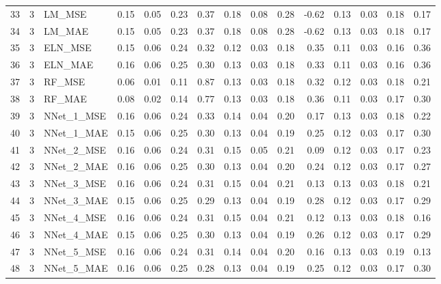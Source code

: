 \begin{table}[ht]
\begin{tabular}{rrlrrrrrrrrrrrr}
  33 &   3 & LM\_MSE & 0.15 & 0.05 & 0.23 & 0.37 & 0.18 & 0.08 & 0.28 & -0.62 & 0.13 & 0.03 & 0.18 & 0.17 \\ 
  34 &   3 & LM\_MAE & 0.15 & 0.05 & 0.23 & 0.37 & 0.18 & 0.08 & 0.28 & -0.62 & 0.13 & 0.03 & 0.18 & 0.17 \\ 
  35 &   3 & ELN\_MSE & 0.15 & 0.06 & 0.24 & 0.32 & 0.12 & 0.03 & 0.18 & 0.35 & 0.11 & 0.03 & 0.16 & 0.36 \\ 
  36 &   3 & ELN\_MAE & 0.16 & 0.06 & 0.25 & 0.30 & 0.13 & 0.03 & 0.18 & 0.33 & 0.11 & 0.03 & 0.16 & 0.36 \\ 
  37 &   3 & RF\_MSE & 0.06 & 0.01 & 0.11 & 0.87 & 0.13 & 0.03 & 0.18 & 0.32 & 0.12 & 0.03 & 0.18 & 0.21 \\ 
  38 &   3 & RF\_MAE & 0.08 & 0.02 & 0.14 & 0.77 & 0.13 & 0.03 & 0.18 & 0.36 & 0.11 & 0.03 & 0.17 & 0.30 \\ 
  39 &   3 & NNet\_1\_MSE & 0.16 & 0.06 & 0.24 & 0.33 & 0.14 & 0.04 & 0.20 & 0.17 & 0.13 & 0.03 & 0.18 & 0.22 \\ 
  40 &   3 & NNet\_1\_MAE & 0.15 & 0.06 & 0.25 & 0.30 & 0.13 & 0.04 & 0.19 & 0.25 & 0.12 & 0.03 & 0.17 & 0.30 \\ 
  41 &   3 & NNet\_2\_MSE & 0.16 & 0.06 & 0.24 & 0.31 & 0.15 & 0.05 & 0.21 & 0.09 & 0.12 & 0.03 & 0.17 & 0.23 \\ 
  42 &   3 & NNet\_2\_MAE & 0.16 & 0.06 & 0.25 & 0.30 & 0.13 & 0.04 & 0.20 & 0.24 & 0.12 & 0.03 & 0.17 & 0.27 \\ 
  43 &   3 & NNet\_3\_MSE & 0.16 & 0.06 & 0.24 & 0.31 & 0.15 & 0.04 & 0.21 & 0.13 & 0.13 & 0.03 & 0.18 & 0.21 \\ 
  44 &   3 & NNet\_3\_MAE & 0.15 & 0.06 & 0.25 & 0.29 & 0.13 & 0.04 & 0.19 & 0.28 & 0.12 & 0.03 & 0.17 & 0.29 \\ 
  45 &   3 & NNet\_4\_MSE & 0.16 & 0.06 & 0.24 & 0.31 & 0.15 & 0.04 & 0.21 & 0.12 & 0.13 & 0.03 & 0.18 & 0.16 \\ 
  46 &   3 & NNet\_4\_MAE & 0.15 & 0.06 & 0.25 & 0.30 & 0.13 & 0.04 & 0.19 & 0.26 & 0.12 & 0.03 & 0.17 & 0.29 \\ 
  47 &   3 & NNet\_5\_MSE & 0.16 & 0.06 & 0.24 & 0.31 & 0.14 & 0.04 & 0.20 & 0.16 & 0.13 & 0.03 & 0.19 & 0.13 \\ 
  48 &   3 & NNet\_5\_MAE & 0.16 & 0.06 & 0.25 & 0.28 & 0.13 & 0.04 & 0.19 & 0.25 & 0.12 & 0.03 & 0.17 & 0.30 \\ 
   \hline
\end{tabular}
\end{table}
